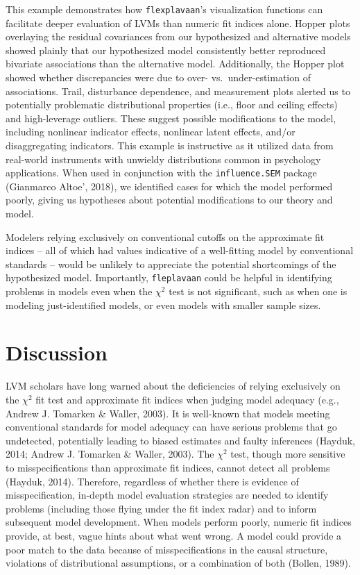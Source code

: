 \documentclass[
  english,
  man]{apa6}
\begin{document}
This example demonstrates how \texttt{flexplavaan}'s visualization functions can facilitate deeper evaluation of LVMs than numeric fit indices alone. Hopper plots overlaying the residual covariances from our hypothesized and alternative models showed plainly that our hypothesized model consistently better reproduced bivariate associations than the alternative model. Additionally, the Hopper plot showed whether discrepancies were due to over- vs.~under-estimation of associations. Trail, disturbance dependence, and measurement plots alerted us to potentially problematic distributional properties (i.e., floor and ceiling effects) and high-leverage outliers. These suggest possible modifications to the model, including nonlinear indicator effects, nonlinear latent effects, and/or disaggregating indicators. This example is instructive as it utilized data from real-world instruments with unwieldy distributions common in psychology applications. When used in conjunction with the \texttt{influence.SEM} package (Gianmarco Altoe', 2018), we identified cases for which the model performed poorly, giving us hypotheses about potential modifications to our theory and model.

Modelers relying exclusively on conventional cutoffs on the approximate fit indices -- all of which had values indicative of a well-fitting model by conventional standards -- would be unlikely to appreciate the potential shortcomings of the hypothesized model. Importantly, \texttt{fleplavaan} could be helpful in identifying problems in models even when the \(\chi^2\) test is not significant, such as when one is modeling just-identified models, or even models with smaller sample sizes.

\hypertarget{discussion}{%
\section{Discussion}\label{discussion}}

LVM scholars have long warned about the deficiencies of relying exclusively on the \(\chi^2\) fit test and approximate fit indices when judging model adequacy (e.g., Andrew J. Tomarken \& Waller, 2003). It is well-known that models meeting conventional standards for model adequacy can have serious problems that go undetected, potentially leading to biased estimates and faulty inferences (Hayduk, 2014; Andrew J. Tomarken \& Waller, 2003). The \(\chi^2\) test, though more sensitive to misspecifications than approximate fit indices, cannot detect all problems (Hayduk, 2014). Therefore, regardless of whether there is evidence of misspecification, in-depth model evaluation strategies are needed to identify problems (including those flying under the fit index radar) and to inform subsequent model development. When models perform poorly, numeric fit indices provide, at best, vague hints about what went wrong. A model could provide a poor match to the data because of misspecifications in the causal structure, violations of distributional assumptions, or a combination of both (Bollen, 1989).
\end{document}

